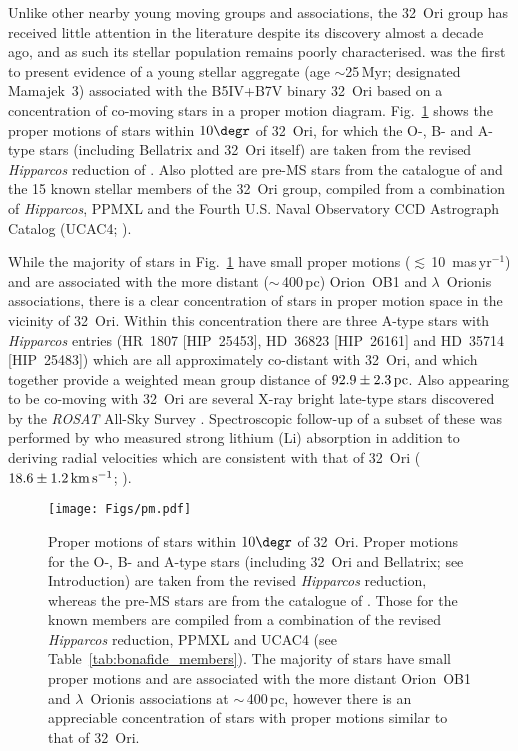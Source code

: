 \documentclass[usenatbib]{mnras}
\newcommand{\masyr}{mas\,yr$^{-1}$}
\begin{document}
Unlike other nearby young moving groups and associations, the 32~Ori
group has received little attention in the literature despite its
discovery almost a decade ago, and as such its stellar population
remains poorly characterised. \cite{Mamajek07} was the first to
present evidence of a young stellar aggregate (age $\sim$25\,Myr;
designated Mamajek~3) associated with the B5IV+B7V binary 32~Ori based
on a concentration of co-moving stars in a proper motion
diagram. Fig.~\ref{fig:proper_motion} shows the proper motions of
stars within $10\degr$ of 32~Ori, for which the O-, B- and A-type
stars (including Bellatrix and 32~Ori itself) are taken from the
revised \emph{Hipparcos} reduction of \cite{vanLeeuwen07}. Also
plotted are pre-MS stars from the catalogue of \cite{Ducourant05} and
the 15 known stellar members of the 32~Ori group, compiled from a
combination of \emph{Hipparcos}, PPMXL \citep*{Roeser10} and the
Fourth U.S. Naval Observatory CCD Astrograph Catalog (UCAC4;
\citealp{Zacharias13}).

While the majority of stars in Fig.~\ref{fig:proper_motion} have small
proper motions ($\lesssim$\,10~\masyr) and are associated with the
more distant ($\sim$\,400\,pc) Orion~OB1 and $\lambda$~Orionis
associations, there is a clear concentration of stars in proper motion
space in the vicinity of 32~Ori. Within this concentration there are
three A-type stars with \emph{Hipparcos} entries (HR~1807 [HIP~25453],
HD~36823 [HIP~26161] and HD~35714 [HIP~25483]) which are all
approximately co-distant with 32~Ori, and which together provide a
weighted mean group distance of $92.9\pm2.3\,\rm{pc}$. Also appearing
to be co-moving with 32~Ori are several X-ray bright late-type stars
discovered by the \emph{ROSAT} All-Sky Survey
\citep{Voges99}. Spectroscopic follow-up of a subset of these was
performed by \cite{Alcala96,Alcala00} who measured strong lithium (Li)
absorption in addition to deriving radial velocities which are
consistent with that of 32~Ori ($18.6\pm1.2\,\rm{km\,s^{-1}}$;
\citealp{Barbier-Brossat00}).

\begin{figure}
\centering
\texttt{[image: Figs/pm.pdf]}
\caption[]{Proper motions of stars within $10\degr$ of 32~Ori. Proper
  motions for the O-, B- and A-type stars (including 32~Ori and
  Bellatrix; see Introduction) are taken from the revised
  \emph{Hipparcos} reduction, whereas the pre-MS stars are from the
  catalogue of \cite{Ducourant05}. Those for the known members are
  compiled from a combination of the revised \emph{Hipparcos}
  reduction, PPMXL and UCAC4 (see
  Table~\ref{tab:bonafide_members}). The majority of stars have small
  proper motions and are associated with the more distant Orion~OB1
  and $\lambda$~Orionis associations at $\sim$\,400\,pc, however there is
  an appreciable concentration of stars with proper motions similar to
  that of 32~Ori.}
\label{fig:proper_motion}
\end{figure}
\end{document}
